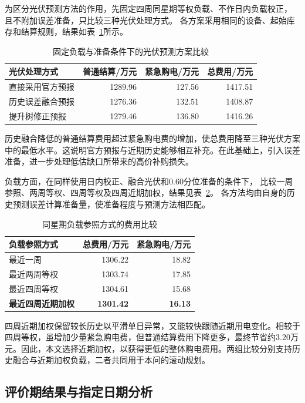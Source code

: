 为区分光伏预测方法的作用，先固定四周同星期等权负载、不作日内负载校正，
且不附加误差准备，只比较三种光伏处理方式。
各方案采用相同的设备、起始库存和结算规则，结果如表~\ref{tab:q3_candidate}所示。

\begin{table}[H]
\centering
\caption{固定负载与准备条件下的光伏预测方案比较}
\label{tab:q3_candidate}
\begin{tabular}{lrrr}
\toprule
光伏处理方式 & 普通结算/万元 & 紧急购电/万元 & 总费用/万元\\
\midrule
直接采用官方预报 &1289.96&127.56&1417.51\\
历史误差融合预报 &1276.36&132.51&1408.87\\
提升树修正预报 &1279.46&136.80&1416.26\\
\bottomrule
\end{tabular}
\end{table}

历史融合降低的普通结算费用超过紧急购电费的增加，使总费用降至三种光伏方案中的最低水平。这说明官方预报与近期历史能够相互补充。在此基础上，引入误差准备，进一步处理低估缺口所带来的高价补购损失。

负载方面，在同样使用日内校正、融合光伏和0.60分位准备的条件下，
比较一周参照、两周等权、四周等权及四周近期加权，结果见表~\ref{tab:q3_load_compare}。
各方法均由自身的历史预测误差计算准备量，使准备程度与预测方法相匹配。

\begin{table}[H]
\centering
\caption{同星期负载参照方式的费用比较}
\label{tab:q3_load_compare}
\begin{tabular}{lrr}
\toprule
负载参照方式 & 总费用/万元 & 紧急购电/万元\\
\midrule
最近一周 &1306.22&18.82\\
最近两周等权 &1303.74&17.85\\
最近四周等权 &1304.61&15.68\\
\textbf{最近四周近期加权} &\textbf{1301.42}&\textbf{16.13}\\
\bottomrule
\end{tabular}
\end{table}

四周近期加权保留较长历史以平滑单日异常，又能较快跟随近期用电变化。相较于四周等权，虽增加少量紧急购电费，但普通结算费用下降更多，最终节省约3.20万元。因此，本文选择近期加权，以获得更低的整体购电费用。两组比较分别支持历史融合与近期加权负载，二者共同用于本问的滚动规划。

\subsection{评价期结果与指定日期分析}

